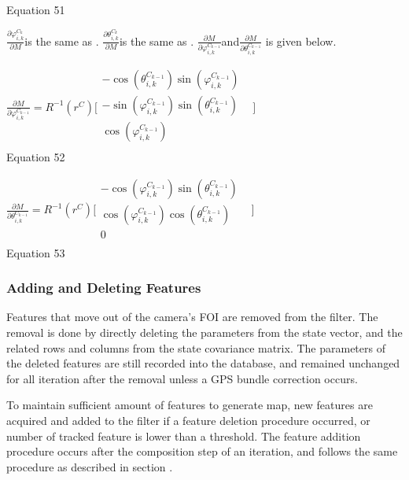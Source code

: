 Equation 51

$\frac{\partial \varphi _{i, k}^{C_{k}}}{\partial M}$is the same as . 
$\frac{\partial \theta _{i, k}^{C_{k}}}{\partial M}$is the same as . 
$\frac{\partial M}{\partial \varphi _{i,k}^{C_{k-1}}}$and$
\frac{\partial M}{\partial \theta _{i, k}^{C_{k-1}}}$ is given below.

$\frac{\partial M}{\partial \varphi 
_{i,k}^{C_{k-1}}}=R^{-1}(r^{C})\lbrack \begin{matrix}
-\cos (\theta _{i, k}^{C_{k-1}})\sin (\varphi _{i,k}^{C_{k-1}}) & \\
-\sin (\varphi _{i,k}^{C_{k-1}})\sin (\theta _{i, k}^{C_{k-1}}) & \\
\cos (\varphi _{i,k}^{C_{k-1}}) & \\
\end{matrix}
\rbrack $\\


Equation 52

$\frac{\partial M}{\partial \theta _{i, 
k}^{C_{k-1}}}=R^{-1}(r^{C})\lbrack \begin{matrix}
-\cos (\varphi _{i,k}^{C_{k-1}})\sin (\theta _{i, k}^{C_{k-1}}) & \\
\cos (\varphi _{i,k}^{C_{k-1}})\cos (\theta _{i, k}^{C_{k-1}}) & \\
0 & \\
\end{matrix}
\rbrack $\\


Equation 53

\subsubsection{Adding and Deleting 
Features}\label{section:_Toc332876136}
Features that move out of the camera's FOI are removed from the filter. 
The removal is done by directly deleting the parameters from the state 
vector, and the related rows and columns from the state covariance 
matrix. The parameters of the deleted features are still recorded into 
the database, and remained unchanged for all iteration after the removal 
unless a GPS bundle correction occurs. 

To maintain sufficient amount of features to generate map, new features 
are acquired and added to the filter if a feature deletion procedure 
occurred, or number of tracked feature is lower than a threshold. The 
feature addition procedure occurs after the composition step of an 
iteration, and follows the same procedure as described in section . 

